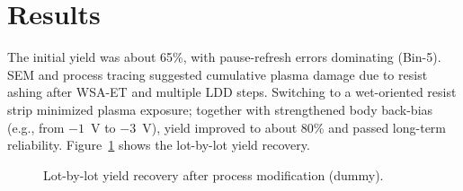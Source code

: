\section{Results}

The initial yield was about 65\%, with pause-refresh errors dominating (Bin-5).
SEM and process tracing suggested cumulative plasma damage due to resist ashing after WSA-ET and multiple LDD steps.
Switching to a wet-oriented resist strip minimized plasma exposure; together with strengthened body back-bias (e.g., from $-1$~V to $-3$~V), yield improved to about 80\% and passed long-term reliability.
Figure~\ref{fig:yield} shows the lot-by-lot yield recovery.

\begin{figure}[t]
\centering
\yielddummyfigure[\columnwidth]
\caption{Lot-by-lot yield recovery after process modification (dummy).}
\label{fig:yield}
\end{figure}
